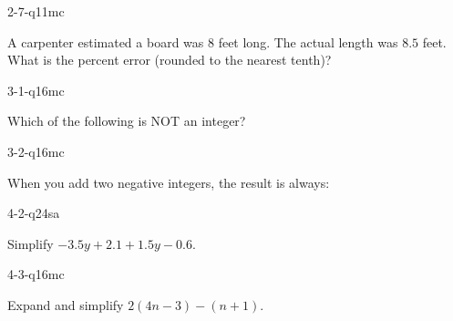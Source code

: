 \begin{practiceQuestion}{2-7-q11}{mc}
\begin{questionText}
A carpenter estimated a board was $8$ feet long. The actual length was $8.5$ feet. What is the percent error (rounded to the nearest tenth)?
\end{questionText}
\end{practiceQuestion}

\begin{practiceQuestion}{3-1-q16}{mc}
\begin{questionText}
Which of the following is NOT an integer?
\end{questionText}
\end{practiceQuestion}

\begin{practiceQuestion}{3-2-q16}{mc}
\begin{questionText}
When you add two negative integers, the result is always:
\end{questionText}
\end{practiceQuestion}

\begin{practiceQuestion}{4-2-q24}{sa}
\begin{questionText}
Simplify $-3.5y + 2.1 + 1.5y - 0.6$.
\end{questionText}
\end{practiceQuestion}

\begin{practiceQuestion}{4-3-q16}{mc}
\begin{questionText}
Expand and simplify $2(4n - 3) - (n + 1)$.
\end{questionText}
\end{practiceQuestion}

